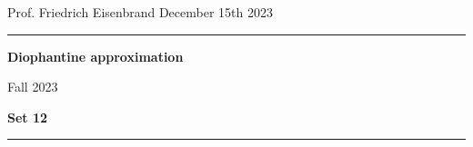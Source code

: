 \documentclass[12pt,a4paper]{article}
\date{}
\theoremstyle{plain}
\newtheorem*{Sol*}{Solution}
\theoremstyle{definition}
\newtheorem{Ex}{Exercise}
\newif\ifsolutions
\newcommand{\exercise}[2]{
			\begin{Ex} #1 \end{Ex}
			\ifsolutions  \begin{Sol*} #2 \end{Sol*} \bigskip \else \bigskip  \fi
		}
\begin{document}
\begin{center}
{Prof. Friedrich Eisenbrand \hfill December 15th 2023}
\end{center}
	
\hrule\vspace{\baselineskip}

\begin{center}
\textbf{Diophantine approximation}

Fall 2023

\bigskip

\textbf{Set 12}
\ifsolutions{\textbf{- Solutions}} \else{} \fi
\end{center}

\hrule\vspace{\baselineskip}



\end{document}
